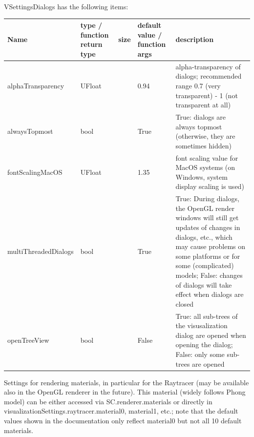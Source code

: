 \noindent VSettingsDialogs has the following items:
\begin{center}
  \footnotesize
  \begin{longtable}{| p{4.2cm} | p{2.5cm} | p{0.3cm} | p{3.0cm} | p{6cm} |}
    \hline
    \bf Name & \bf type / function return type & \bf size & \bf default value / function args & \bf description \\ \hline
    alphaTransparency &     UFloat &      &     0.94 &     alpha-transparency of dialogs; recommended range 0.7 (very transparent) - 1 (not transparent at all)\\ \hline
    alwaysTopmost &     bool &      &     True &     True: dialogs are always topmost (otherwise, they are sometimes hidden)\\ \hline
    fontScalingMacOS &     UFloat &      &     1.35 &     font scaling value for MacOS systems (on Windows, system display scaling is used)\\ \hline
    multiThreadedDialogs &     bool &      &     True &     True: During dialogs, the OpenGL render windows will still get updates of changes in dialogs, etc., which may cause problems on some platforms or for some (complicated) models; False: changes of dialogs will take effect when dialogs are closed\\ \hline
    openTreeView &     bool &      &     False &     True: all sub-trees of the visusalization dialog are opened when opening the dialog; False: only some sub-trees are opened\\ \hline
	  \end{longtable}
	\end{center}



\label{sec:VSettingsMaterial}
Settings for rendering materials, in particular for the Raytracer (may be available also in the OpenGL renderer in the future). This material (widely follows Phong model) can be either accessed via SC.renderer.materials or directly in visualizationSettings.raytracer.material0, material1, etc.; note that the default values shown in the documentation only reflect material0 but not all 10 default materials.

